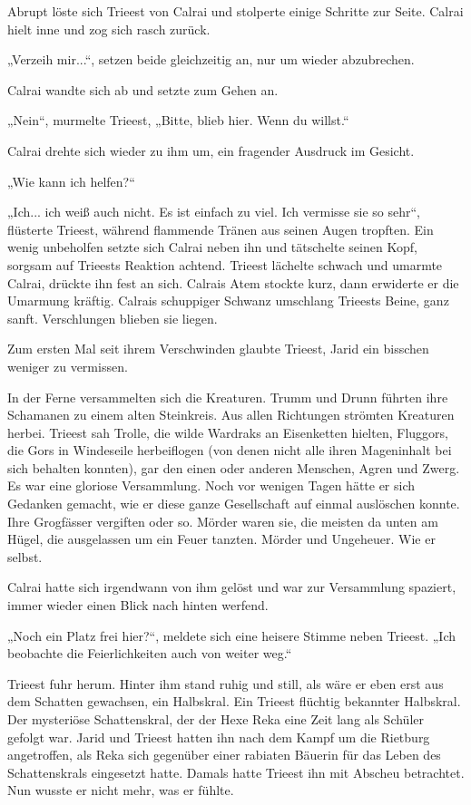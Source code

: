 Abrupt löste sich Trieest von Calrai und stolperte einige Schritte zur Seite. Calrai hielt inne und zog sich rasch zurück.

„Verzeih mir...“, setzen beide gleichzeitig an, nur um wieder abzubrechen.

Calrai wandte sich ab und setzte zum Gehen an.

„Nein“, murmelte Trieest, „Bitte, blieb hier. Wenn du willst.“

Calrai drehte sich wieder zu ihm um, ein fragender Ausdruck im Gesicht.

„Wie kann ich helfen?“

„Ich... ich weiß auch nicht. Es ist einfach zu viel. Ich vermisse sie so sehr“, flüsterte Trieest, während flammende Tränen aus seinen Augen tropften. Ein wenig unbeholfen setzte sich Calrai neben ihn und tätschelte seinen Kopf, sorgsam auf Trieests Reaktion achtend. Trieest lächelte schwach und umarmte Calrai, drückte ihn fest an sich. Calrais Atem stockte kurz, dann erwiderte er die Umarmung kräftig. Calrais schuppiger Schwanz umschlang Trieests Beine, ganz sanft. Verschlungen blieben sie liegen.

Zum ersten Mal seit ihrem Verschwinden glaubte Trieest, Jarid ein bisschen weniger zu vermissen.



\trennzeichen



In der Ferne versammelten sich die Kreaturen. Trumm und Drunn führten ihre Schamanen zu einem alten Steinkreis. Aus allen Richtungen strömten Kreaturen herbei. Trieest sah Trolle, die wilde Wardraks an Eisenketten hielten, Fluggors, die Gors in Windeseile herbeiflogen (von denen nicht alle ihren Mageninhalt bei sich behalten konnten), gar den einen oder anderen Menschen, Agren und Zwerg. Es war eine gloriose Versammlung. Noch vor wenigen Tagen hätte er sich Gedanken gemacht, wie er diese ganze Gesellschaft auf einmal auslöschen konnte. Ihre Grogfässer vergiften oder so. Mörder waren sie, die meisten da unten am Hügel, die ausgelassen um ein Feuer tanzten. Mörder und Ungeheuer. Wie er selbst.

Calrai hatte sich irgendwann von ihm gelöst und war zur Versammlung spaziert, immer wieder einen Blick nach hinten werfend.

„Noch ein Platz frei hier?“, meldete sich eine heisere Stimme neben Trieest. „Ich beobachte die Feierlichkeiten auch von weiter weg.“

Trieest fuhr herum. Hinter ihm stand ruhig und still, als wäre er eben erst aus dem Schatten gewachsen, ein Halbskral. Ein Trieest flüchtig bekannter Halbskral. Der mysteriöse Schattenskral, der der Hexe Reka eine Zeit lang als Schüler gefolgt war. Jarid und Trieest hatten ihn nach dem Kampf um die Rietburg angetroffen, als Reka sich gegenüber einer rabiaten Bäuerin für das Leben des Schattenskrals eingesetzt hatte. Damals hatte Trieest ihn mit Abscheu betrachtet. Nun wusste er nicht mehr, was er fühlte.


